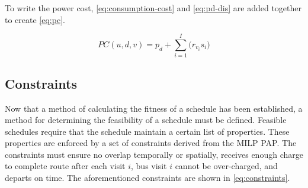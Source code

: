 \documentclass[11pt,a4paper,final]{article}
\newcommand{\PC}{PC(u, d, v)}               %
\begin{document}
To write the power cost, \ref{eq:consumption-cost} and \ref{eq:pd-dis} are added together to create \ref{eq:pc}.

\begin{equation}
\label{eq:pc}
\PC = p_d + \sum_{i=1}^I \Big( r_{v_i}s_i \Big)
\end{equation}

\subsection{Constraints}
\label{sec:constraints}
Now that a method of calculating the fitness of a schedule has been established, a method for determining the
feasibility of a schedule must be defined. Feasible schedules require that the schedule maintain a certain list of
properties. These properties are enforced by a set of constraints derived from the MILP PAP. The constraints must ensure
no overlap temporally or spatially, receives enough charge to complete route after each visit \(i\), bus visit \(i\) cannot
be over-charged, and departs on time. The aforementioned constraints are shown in \ref{eq:constraints}.
\end{document}
